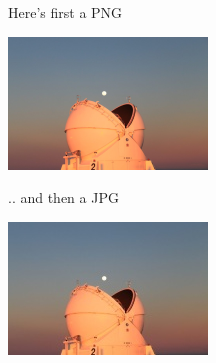 \documentclass{article}
\begin{document}
Here's first a PNG
\begin{center}
\includegraphics[width=\textwidth]{pacman.png}
\end{center}
.. and then a JPG
\begin{center}
\includegraphics[width=\textwidth]{pacman.jpg}
\end{center}
\end{document}
